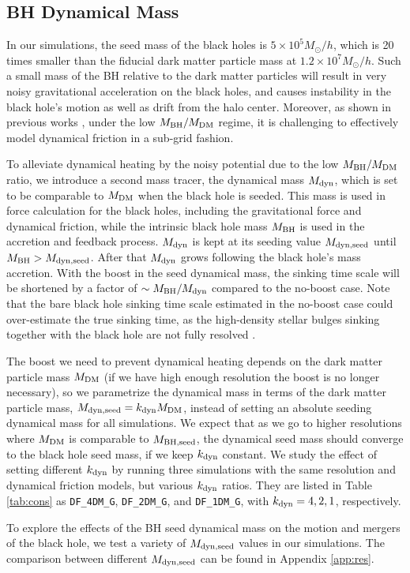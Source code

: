\subsection{BH Dynamical Mass}
\label{subsec:mdyn}
In our simulations, the seed mass of the black holes is $5\times 10^5 M_\odot/h$, which is 20 times smaller than the fiducial dark matter particle mass at $1.2\times 10^7 M_\odot/h$. Such a small mass of the BH relative to the dark matter particles will result in very noisy gravitational acceleration on the black holes, and causes instability in the black hole's motion as well as drift from the halo center. Moreover, as shown in previous works \citep[e.g.][]{Tremmel2015,Pfister2019}, under the low $M_{\rm BH}/M_{\rm DM}$ regime, it is challenging to effectively model dynamical friction in a sub-grid fashion.

To alleviate dynamical heating by the noisy potential due to the low $M_{\rm BH}/M_{\rm DM}$ ratio, we introduce a second mass tracer, the dynamical mass $M_{\rm dyn}$, which is set to be comparable to $M_{\rm DM}$ when the black hole is seeded. This mass is used in force calculation for the black holes, including the gravitational force and dynamical friction, while the intrinsic black hole mass $M_{\rm BH}$ is used in the accretion and feedback process. $M_{\rm dyn}$ is kept at its seeding value $M_{\rm dyn,seed}$ until $M_{\rm BH}>M_{\rm dyn,seed}$. After that $M_{\rm dyn}$ grows following the black hole's mass accretion. With the boost in the seed dynamical mass, the sinking time scale will be shortened by a factor of $\sim M_{\rm BH}/M_{\rm dyn}$ compared to the no-boost case. Note that the bare black hole sinking time scale estimated in the no-boost case could over-estimate the true sinking time, as the high-density stellar bulges sinking together with the black hole are not fully resolved \citep[e.g.][]{Antonini2012,Dosopoulou2017,Biernacki2017}.

 The boost we need to prevent dynamical heating depends on the dark matter particle mass $M_{\rm DM}$ (if we have high enough resolution the boost is no longer necessary), so we parametrize the dynamical mass in terms of the dark matter particle mass, $M_{\rm dyn,seed} = k_{\rm dyn} M_{\rm DM}$, instead of setting an absolute seeding dynamical mass for all simulations. We expect that as we go to higher resolutions where $M_{\rm DM}$ is comparable to $M_{\rm BH,seed}$, the dynamical seed mass should converge to the black hole seed mass, if we keep $k_{\rm dyn}$ constant. We study the effect of setting different $k_{\rm dyn}$ by running three simulations with the same resolution and dynamical friction models, but various $k_{\rm dyn}$ ratios. They are listed in Table \ref{tab:cons} as \texttt{DF\_4DM\_G}, \texttt{DF\_2DM\_G}, and \texttt{DF\_1DM\_G}, with $k_{\rm dyn}=4,2,1$, respectively.

To explore the effects of the BH seed dynamical mass on the motion and mergers of the black hole, we test a variety of $M_{\rm dyn,seed}$ values in our simulations. The comparison between different $M_{\rm dyn,seed}$ can be found in Appendix \ref{app:res}. 
